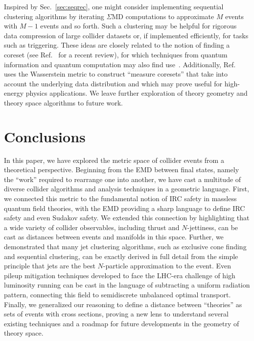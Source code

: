 \documentclass[letterpaper,11pt]{article}
\DeclareRobustCommand{\Sec}[1]{Sec.~\ref{#1}}
\DeclareRobustCommand{\Ref}[1]{Ref.~\cite{#1}}
\begin{document}
Inspired by \Sec{sec:seqrec}, one might consider implementing sequential clustering algorithms by iterating $\Sigma$MD computations to approximate $M$ events with $M-1$ events and so forth.
%
Such a clustering may be helpful for rigorous data compression of large collider datasets or, if implemented efficiently, for tasks such as triggering.
%
These ideas are closely related to the notion of finding a coreset (see \Ref{2019arXiv191008707J} for a recent review), for which techniques from quantum information and quantum computation may also find use~\cite{harrow2020small}.
%
Additionally, \Ref{DBLP:journals/corr/abs-1805-07412} uses the Wasserstein metric to construct ``measure coresets'' that take into account the underlying data distribution and which may prove useful for high-energy physics applications.
%
We leave further exploration of theory geometry and theory space algorithms to future work.


\section{Conclusions}
\label{sec:conc}


In this paper, we have explored the metric space of collider events from a theoretical perspective.
%
Beginning from the EMD between final states, namely the ``work'' required to rearrange one into another, we have cast a multitude of diverse collider algorithms and analysis techniques in a geometric language.
%
First, we connected this metric to the fundamental notion of IRC safety in massless quantum field theories, with the EMD providing a sharp language to define IRC safety and even Sudakov safety.
%
We extended this connection by highlighting that a wide variety of collider observables, including thrust and $N$-jettiness, can be cast as distances between events and manifolds in this space.
%
Further, we demonstrated that many jet clustering algorithms, such as exclusive cone finding and sequential clustering, can be exactly derived in full detail from the simple principle that jets are the best $N$-particle approximation to the event.
%
Even pileup mitigation techniques developed to face the LHC-era challenge of high luminosity running can be cast in the language of subtracting a uniform radiation pattern, connecting this field to semidiscrete unbalanced optimal transport.
%
Finally, we generalized our reasoning to define a distance between ``theories'' as sets of events with cross sections, proving a new lens to understand several existing techniques and a roadmap for future developments in the geometry of theory space.
\end{document}
